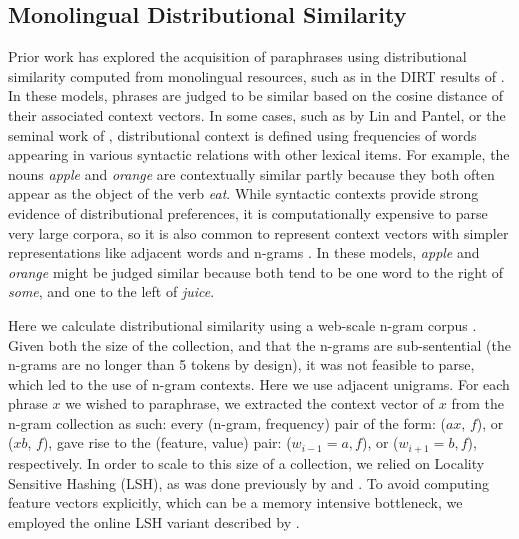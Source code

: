 \documentclass[11pt]{article}
\begin{document}

\subsection{Monolingual Distributional Similarity}\label{section:monolingual-distributional-similarity}
\label{sect:mds}

Prior work has explored the acquisition of paraphrases using distributional
similarity computed from monolingual resources, such as in the DIRT results of
. In these models, phrases are judged to be similar
based on the cosine distance of their associated context vectors. In some cases,
such as by Lin and Pantel, or the seminal work of ,
distributional context is defined using frequencies of words appearing in
various syntactic relations with other lexical items. For example, the nouns
\emph{apple} and \emph{orange} are contextually similar partly because they both
often appear as the object of the verb \emph{eat}. While syntactic contexts
provide strong evidence of distributional preferences, it is computationally
expensive to parse very large corpora, so it is also common to represent context
vectors with simpler representations like adjacent words and n-grams
\cite{ChurchHanks91,LapataKellerSaLP05,BhagatRavichandran08,Bergsma:09,VanDurmeLallACL10}. In
these models, \emph{apple} and \emph{orange} might be judged similar because
both tend to be one word to the right of \emph{some}, and one to the left of
\emph{juice}.

Here we calculate distributional similarity using a web-scale n-gram corpus
\cite{GoogleNgrams,LinEtAlLREC10}. Given both the size of the collection, and
that the n-grams are sub-sentential (the n-grams are no longer than 5 tokens by
design), it was not feasible to parse, which led to the use of n-gram contexts.  Here we use adjacent unigrams.
For each phrase $x$ we wished to paraphrase, we extracted the context vector of
$x$ from the n-gram collection as such: every (n-gram, frequency) pair of the
form: ($a x$, $f$), or ($x b$, $f$), gave rise to the (feature, value) pair:
($w_{i-1}=a, f$), or ($w_{i+1}=b, f$), respectively. In order to scale to this
size of a collection, we relied on Locality Sensitive Hashing (LSH), as was done
previously by  and . To
avoid computing feature vectors explicitly, which can be a memory intensive
bottleneck, we employed the online LSH variant described by
.
\end{document}
